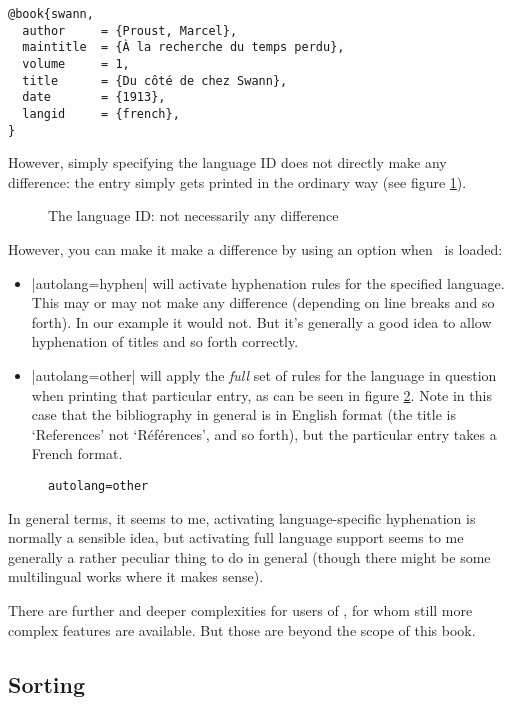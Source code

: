 \begin{verbatim}
@book{swann,
  author     = {Proust, Marcel},
  maintitle  = {À la recherche du temps perdu},
  volume     = 1,
  title      = {Du côté de chez Swann},
  date       = {1913},
  langid     = {french},
}
\end{verbatim}

However, simply specifying the language ID does not directly make any difference: the entry simply gets printed in the ordinary way (see figure \ref{proust1}).
\begin{figure}
\caption{The language ID: not necessarily any difference\label{proust1}}
\end{figure}

However, you can make it make a difference by using an option when \biblatex\ is loaded:
\begin{itemize}
\item |autolang=hyphen| will activate hyphenation rules for the specified language. This may or may not make any difference (depending on line breaks and so forth). In our example it would not. But it's generally a good idea to allow hyphenation of titles and so forth correctly.
\item |autolang=other| will apply the \emph{full} set of rules for the language in question when printing that particular entry, as can be seen in figure \ref{proust2}. Note in this case that the bibliography in general is in English format (the title is `References' not `Références', and so forth), but the particular entry takes a French format.
\end{itemize}

\begin{figure}
\caption{\texttt{autolang=other}\label{proust2}}
\end{figure}

In general terms, it seems to me, activating language-specific hyphenation is normally a sensible idea, but activating full language support seems to me generally a rather peculiar thing to do in general (though there might be some multilingual works where it makes sense).

There are further and deeper complexities for users of , for whom still more complex features are available. But those are beyond the scope of this book.

\subsection{Sorting}

